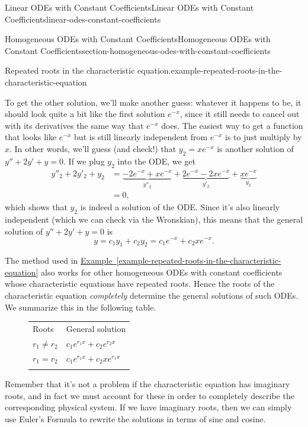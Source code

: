 \documentclass[oneside,10pt,]{book}
\numberwithin{equation}{section}
\newcommand{\hrulethick} {\noalign{\hrule height 0.11em}}
\newcommand{\amp}{&}
\begin{document}
\begin{chapterptx}{Linear ODEs with Constant Coefficients}{}{Linear ODEs with Constant Coefficients}{}{}{linear-odes-constant-coefficients}
\begin{sectionptx}{Homogeneous ODEs with Constant Coefficients}{}{Homogeneous ODEs with Constant Coefficients}{}{}{section-homogeneous-odes-with-constant-coefficients}
\begin{example}{Repeated roots in the characteristic equation.}{example-repeated-roots-in-the-characteristic-equation}
\par
\hypertarget{p-195}{}%
To get the other solution, we'll make another guess: whatever it happens to be, it should look quite a bit like the first solution \(e^{-x}\), since it still needs to cancel out with its derivatives the same way that \(e^{-x}\) does. The easiest way to get a function that looks like \(e^{-x}\) but is still linearly independent from \(e^{-x}\) is to just multiply by \(x\). In other words, we'll guess (and check!) that \(y_{2} = xe^{-x}\) is another solution of \(y''+2y'+y = 0\). If we plug \(y_{2}\) into the ODE, we get%
\begin{align*}
y''_{2} + 2y'_{2} + y_{2} \amp = \underbrace{-2e^{-x} + xe^{-x}}_{y''_{2}} + \underbrace{2e^{-x} - 2xe^{-x}}_{y'_{2}} + \underbrace{xe^{-x}}_{y_{2}} \\
\amp = 0, 
\end{align*}
which shows that \(y_{2}\) is indeed a solution of the ODE. Since it's also linearly independent (which we can check via the Wronskian), this means that the general solution of \(y''+2y'+y=0\) is%
\begin{equation*}
y = c_{1}y_{1} + c_{2}y_{2} = c_{1}e^{-x} + c_{2}xe^{-x}. 
\end{equation*}
%
\end{example}
\hypertarget{p-196}{}%
The method used in \hyperref[example-repeated-roots-in-the-characteristic-equation]{Example~\ref{example-repeated-roots-in-the-characteristic-equation}} also works for other homogeneous ODEs with constant coefficients whose characteristic equations have repeated roots. Hence the roots of the characteristic equation \emph{completely} determine the general solutions of such ODEs. We summarize this in the following table.%
\begin{figure}
\centering
\leavevmode%
\begin{table}
\centering
\begin{tabular}{ll}\hrulethick
Roots&General solution\tabularnewline\hrulethick
\(r_{1}\neq r_{2}\)&\(c_{1}e^{r_{1}x} + c_{2}e^{r_{2}x}\)\tabularnewline\hrulethick
\(r_{1} = r_{2}\)&\(c_{1}e^{r_{1}x} + c_{2}xe^{r_{1}x}\)\tabularnewline\hrulethick
\end{tabular}
\end{table}
\end{figure}
\hypertarget{p-197}{}%
Remember that it's not a problem if the characteristic equation has imaginary roots, and in fact we must account for these in order to completely describe the corresponding physical system. If we have imaginary roots, then we can simply use Euler's Formula to rewrite the solutions in terms of sine and cosine.%

\end{sectionptx}
\end{chapterptx}
\end{document}
